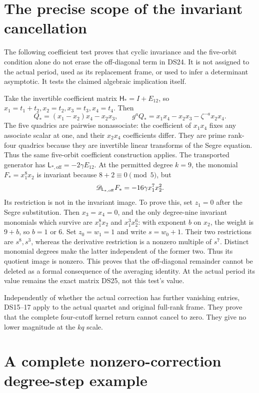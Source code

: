 \documentclass[11pt]{article}
\begin{document}
\section{The precise scope of the invariant cancellation}

The following coefficient test proves that cyclic invariance and the
five-orbit condition alone do not erase the off-diagonal term in DS24.
It is not assigned to the actual period, used as its replacement frame,
or used to infer a determinant asymptotic. It tests the claimed
algebraic implication itself.

Take the invertible coefficient matrix
\(\mathsf H_*=I+E_{12}\), so
\(x_1=t_1+t_2,x_2=t_2,x_3=t_3,x_4=t_4\). Then
\[
Q_*=(x_1-x_2)x_4-x_2x_3,
\qquad g^aQ_*=x_1x_4-x_2x_3-\zeta^{-a}x_2x_4.
\]
The five quadrics are pairwise nonassociate: the coefficient of
\(x_1x_4\) fixes any associate scalar at one, and their
\(x_2x_4\) coefficients differ. They are prime rank-four quadrics
because they are invertible linear transforms of the Segre equation.
Thus the same five-orbit coefficient construction applies.
The transported generator has
\(\mathsf L_{*,\mathrm{off}}=-2\gamma E_{12}\).
At the permitted degree \(k=9\), the monomial
\(F_*=x_1^8x_2\) is invariant because \(8+2\equiv0\pmod5\), but
\[
\mathscr D_{\mathsf L_{*,\mathrm{off}}}F_*
=-16\gamma x_1^7x_2^2.
\]
Its restriction is not in the invariant image. To prove this, set
\(z_1=0\) after the Segre substitution. Then \(x_3=x_4=0\), and
the only degree-nine invariant monomials which survive are
\(x_1^8x_2\) and \(x_1^3x_2^6\): with exponent \(b\) on
\(x_2\), the weight is \(9+b\), so \(b=1\) or \(6\).
Set \(z_0=w_1=1\) and write \(s=w_0+1\). Their two restrictions
are \(s^8,s^3\), whereas the derivative restriction is a nonzero
multiple of \(s^7\). Distinct monomial degrees make the latter
independent of the former two. Thus its quotient image is nonzero.
This proves that the off-diagonal remainder cannot be deleted as a
formal consequence of the averaging identity. At the actual period
its value remains the exact matrix DS25, not this test's value.

Independently of whether the actual correction has further vanishing
entries, DS15--17 apply to the actual quartet and original full-rank
frame. They prove that the complete four-cutoff kernel return cannot
cancel to zero. They give no lower magnitude at the \(kq\) scale.

\section{A complete nonzero-correction degree-step example}
\end{document}
